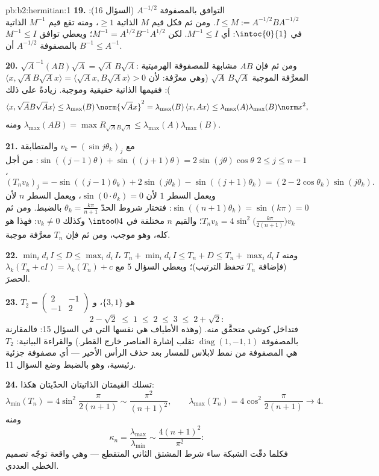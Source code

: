 \begin{solution}{pb:b2:hermitian:1}
\textbf{19.} التوافق بالمصفوفة $A^{-1/2}$ (السؤال 16): $I \leq M
:= A^{-1/2}BA^{-1/2}$. ومن ثم فكل قيم $M$ الذاتية $\geq 1$،
ومنه تقع قيم $M^{-1}$ الذاتية في $\intoc{0}{1}$: أي $M^{-1} \leq I$.
لكن $M^{-1} = A^{1/2}B^{-1}A^{1/2}$؛ ويعطي توافق $M^{-1} \leq
I$ بالمصفوفة $A^{-1/2}$ أن $B^{-1} \leq A^{-1}$.

\textbf{20.} $\sqrt A^{-1}(AB)\sqrt A = \sqrt A\,B\sqrt A$: ومن ثم فإن
$AB$ مشابهة للمصفوفة الهرميتية المعرَّفة الموجبة $\sqrt
A\,B\sqrt A$ (وهي معرَّفة: لأن $\langle x, \sqrt AB\sqrt Ax\rangle =
\langle \sqrt Ax, B\sqrt Ax\rangle > 0$): فقيمها الذاتية
حقيقية وموجبة. زيادةً على ذلك
\[
\langle x, \sqrt AB\sqrt Ax\rangle
\leq \lambda_{\max}(B)\,\norm{\sqrt Ax}^2
= \lambda_{\max}(B)\,\langle x, Ax\rangle
\leq \lambda_{\max}(A)\lambda_{\max}(B)\norm x^2 ,
\]
ومنه $\lambda_{\max}(AB) = \max R_{\sqrt AB\sqrt A} \leq
\lambda_{\max}(A)\lambda_{\max}(B)$.

\textbf{21.} مع $v_k = (\sin j\theta_k)_j$ والمتطابقة
$\sin((j-1)\theta) + \sin((j+1)\theta) =
2\sin(j\theta)\cos\theta$: من أجل $2 \leq j \leq n-1$،
\[
(T_nv_k)_j = -\sin((j{-}1)\theta_k) + 2\sin(j\theta_k) -
\sin((j{+}1)\theta_k)
= (2 - 2\cos\theta_k)\sin(j\theta_k) .
\]
ويعمل السطر $1$ لأن $\sin(0\cdot\theta_k) = 0$، ويعمل السطر $n$
لأن $\sin((n+1)\theta_k) = \sin(k\pi) = 0$: فتختار شروط الحدّ
$\theta_k = \frac{k\pi}{n+1}$ بالضبط. ومن ثم
$T_nv_k = 4\sin^2\bigl(\frac{k\pi}{2(n+1)}\bigr)v_k$؛ والقيم $n$
مختلفة في $\intoo04$ وكذلك $v_k \neq 0$: فهذا هو
 كله، وهو موجب، ومن ثم فإن $T_n$ معرَّفة موجبة.

\textbf{22.} $\min_id_i\,I \leq D \leq \max_id_i\,I$، ومنه $T_n +
\min_id_i\,I \leq T_n + D \leq T_n + \max_id_i\,I$
(فإضافة $T_n$ تحفظ الترتيب)؛ ويعطي السؤال 5 مع
$\lambda_k(T_n + cI) = \lambda_k(T_n) + c$ الحصرَ.

\textbf{23.}  $T_2 = \begin{pmatrix} 2 & -1\\ -1 &
2\end{pmatrix}$ هو $\{3, 1\}$، و
\[
2 - \sqrt2 \;\leq\; 1 \;\leq\; 2 \;\leq\; 3 \;\leq\; 2 +
\sqrt2 :
\]
فتداخل كوشي متحقَّق منه. (وهذه الأطياف هي نفسها التي في
السؤال 15: فالمقارنة بالمصفوفة $\operatorname{diag}(1,-1,1)$ تقلب
إشارة العناصر خارج القطر.) والقراءة البيانية: $T_2$ هي
المصفوفة من نمط لابلاس للمسار بعد حذف الرأس الأخير
--- أي مصفوفة جزئية رئيسية، وهو بالضبط وضع السؤال
11.

\textbf{24.} تسلك القيمتان الذاتيتان الحدّيتان هكذا:
\[
\lambda_{\min}(T_n) = 4\sin^2\frac{\pi}{2(n+1)}
\sim \frac{\pi^2}{(n+1)^2},
\qquad
\lambda_{\max}(T_n) = 4\cos^2\frac{\pi}{2(n+1)}
\longrightarrow 4 .
\]
ومنه
\[
\kappa_n = \frac{\lambda_{\max}}{\lambda_{\min}}
\sim \frac{4(n+1)^2}{\pi^2} :
\]
فكلما دقّت الشبكة ساء شرط المشتق الثاني
المتقطع --- وهي واقعة توجّه تصميم  الخطي
العددي.


\end{solution}
